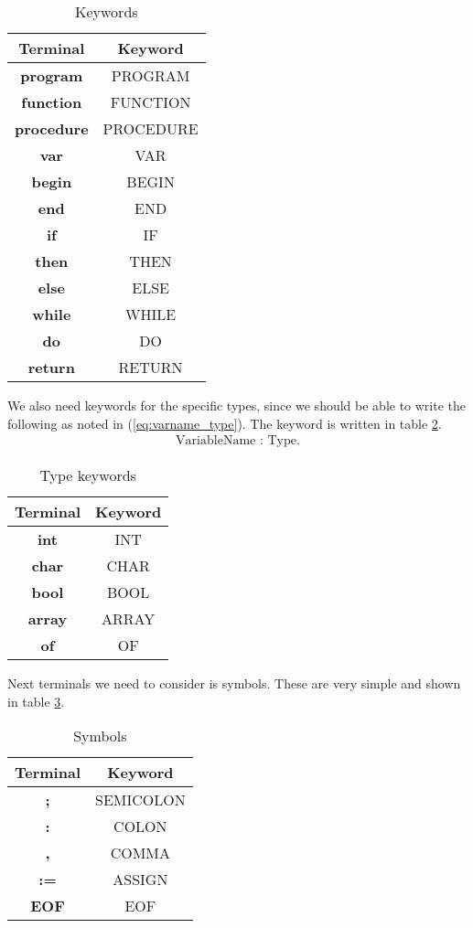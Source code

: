 \documentclass[10pt]{article}
\begin{document}
\begin{table}[h!]
\centering
\begin{tabular}{|c|c|}
\hline
Terminal & Keyword \\
\hline
\textbf{program} & PROGRAM \\
\textbf{function} & FUNCTION \\
\textbf{procedure} & PROCEDURE \\
\textbf{var} & VAR \\
\textbf{begin} & BEGIN \\
\textbf{end} & END \\
\textbf{if} & IF \\
\textbf{then} & THEN \\
\textbf{else} & ELSE \\
\textbf{while} & WHILE \\
\textbf{do} & DO \\
\textbf{return} & RETURN \\
\hline
\end{tabular}
\caption{\label{tab:keywords}Keywords}
\end{table}

We also need keywords for the specific types, since we should be able to write the following as noted in (\ref{eq:varname_type}). The keyword is written in table \ref{tab:type_keywords}.
\begin{align}
\label{eq:varname_type}
\text{VariableName} \textbf{ : } \text{Type}. 
\end{align}

\begin{table}[h!]
\centering
\begin{tabular}{|c|c|}
\hline
Terminal & Keyword \\
\hline
\textbf{int} & INT \\
\textbf{char} & CHAR \\
\textbf{bool} & BOOL \\
\textbf{array} & ARRAY \\
\textbf{of} & OF \\
\hline
\end{tabular}
\caption{\label{tab:type_keywords}Type keywords}
\end{table}

Next terminals we need to consider is symbols. These are very simple and shown in table \ref{tab:symbols}.

\begin{table}[h!]
\centering
\begin{tabular}{|c|c|}
\hline
Terminal & Keyword \\
\hline
\textbf{;} & SEMICOLON \\
\textbf{:} & COLON \\
\textbf{,} & COMMA \\
\textbf{:=} & ASSIGN \\
\textbf{EOF} & EOF \\
\hline
\end{tabular}
\caption{\label{tab:symbols}Symbols}
\end{table}
\end{document}
